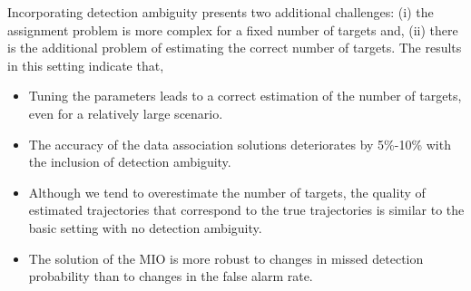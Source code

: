 Incorporating detection ambiguity presents two additional challenges: (i) the assignment problem is more complex for a fixed number of targets and, (ii) there is the additional problem of estimating the correct number of targets.
The results in this setting indicate that,
\begin{itemize}
\item Tuning the parameters leads to a correct estimation of the number of targets, even for a relatively large scenario.
\item The accuracy of the data association solutions deteriorates by 5\%-10\% with the inclusion of detection ambiguity.
\item Although we tend to overestimate the number of targets, the quality of estimated trajectories that correspond to the true trajectories is similar to the basic setting with no detection ambiguity.
\item The solution of the MIO is more robust to changes in missed detection probability than to changes in the false alarm rate.
\end{itemize}

